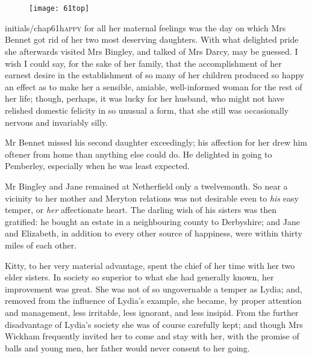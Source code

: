 \chapter[Chapter \thechapter]{}
	
	
\begin{figure}[t!]
\centering
\texttt{[image: 61top]}
\end{figure}


\lettrine[lines=6,image=true]{initials/chap61h}{appy} for all her maternal feelings was the day on which Mrs Bennet got rid of her two most deserving daughters. With what delighted pride she afterwards visited Mrs Bingley, and talked of Mrs Darcy, may be guessed. I wish I could say, for the sake of her family, that the accomplishment of her earnest desire in the establishment of so many of her children produced so happy an effect as to make her a sensible, amiable, well-informed woman for the rest of her life; though, perhaps, it was lucky for her husband, who might not have relished domestic felicity in so unusual a form, that she still was occasionally nervous and invariably silly.

Mr Bennet missed his second daughter exceedingly; his affection for her drew him oftener from home than anything else could do. He delighted in going to Pemberley, especially when he was least expected.

Mr Bingley and Jane remained at Netherfield only a twelvemonth. So near a vicinity to her mother and Meryton relations was not desirable even to \textit{his} easy temper, or \textit{her} affectionate heart. The darling wish of his sisters was then gratified: he bought an estate in a neighbouring county to Derbyshire; and Jane and Elizabeth, in addition to every other source of happiness, were within thirty miles of each other.

Kitty, to her very material advantage, spent the chief of her time with her two elder sisters. In society so superior to what she had generally known, her improvement was great. She was not of so ungovernable a temper as Lydia; and, removed from the influence of Lydia's example, she became, by proper attention and management, less irritable, less ignorant, and less insipid. From the further disadvantage of Lydia's society she was of course carefully kept; and though Mrs Wickham frequently invited her to come and stay with her, with the promise of balls and young men, her father would never consent to her going.

